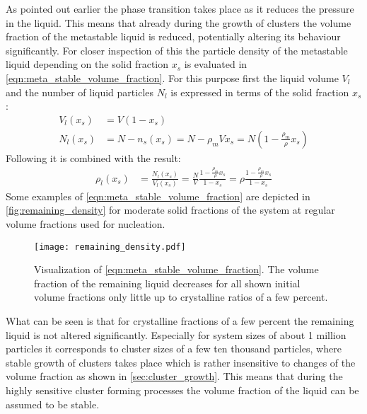 As pointed out earlier the phase transition takes place as it reduces the pressure in the liquid. This means that already during the growth of clusters the volume fraction of the metastable liquid is reduced, potentially altering its behaviour significantly. For closer inspection of this the particle density of the metastable liquid depending on the solid fraction $x_s$ is evaluated in \autoref{eqn:meta_stable_volume_fraction}. For this purpose first the liquid volume $V_l$ and the number of liquid particles $N_l$ is expressed in terms of the solid fraction $x_s$:
\begin{align}
V_l(x_s) & = V(1-x_s)\\
N_l(x_s) & = N-n_s(x_s) = N - \rho_m V x_s = N(1-\frac{\rho_m}{\rho}x_s)
\end{align}
Following it is combined with the result:
\begin{align}
\label{eqn:meta_stable_volume_fraction}
\rho_l(x_s) &= \frac{N_l (x_s) }{ V_l(x_s) } = \frac{N}{V} \frac{1-\frac{\rho_m}{\rho}x_s}{1-x_s} = \rho \frac{1-\frac{\rho_m}{\rho}x_s}{1-x_s}
\end{align}
Some examples of \autoref{eqn:meta_stable_volume_fraction} are depicted in \autoref{fig:remaining_density} for moderate solid fractions of the system at regular volume fractions used for nucleation.\\
\begin{figure}[h]
\centering
\texttt{[image: remaining\_density.pdf]}
\caption{Visualization of \autoref{eqn:meta_stable_volume_fraction}. The volume fraction of the remaining liquid decreases for all shown initial volume fractions only little up to crystalline ratios of a few percent.}
\label{fig:remaining_density}
\end{figure}
What can be seen is that for crystalline fractions of a few percent the remaining liquid is not altered significantly. Especially for system sizes of about 1 million particles it corresponds to cluster sizes of a few ten thousand particles, where stable growth of clusters takes place which is rather insensitive to changes of the volume fraction as shown in \autoref{sec:cluster_growth}. This means that during the highly sensitive cluster forming processes the volume fraction of the liquid can be assumed to be stable.\\ 



